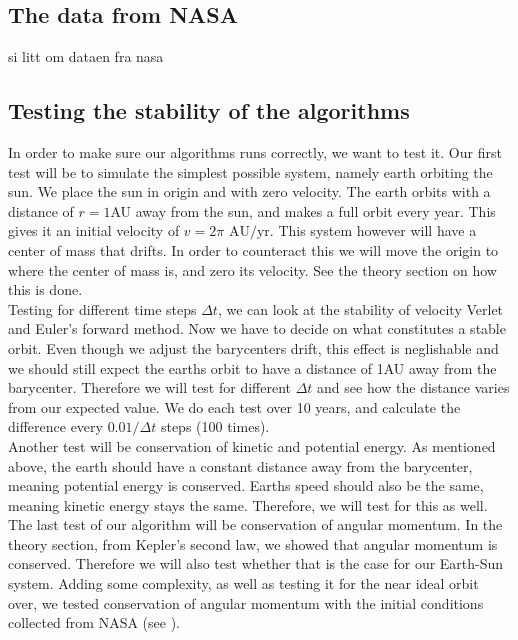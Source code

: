 \documentclass[reprint, english,notitlepage,nofootinbib]{revtex4-1}  %
\begin{document}
\subsection{The data from NASA}
si litt om dataen fra nasa

\subsection{Testing the stability of the algorithms}
In order to make sure our algorithms runs correctly, we want to test it. Our first test will be to simulate the simplest possible system, namely earth orbiting the sun. We place the sun in origin and with zero velocity. The earth orbits with a distance of $r=1$AU away from the sun, and makes a full orbit every year. This gives it an initial velocity of $v = 2\pi \text{ AU}/\text{yr}.$ This system however will have a center of mass that drifts. In order to counteract this we will move the origin to where the center of mass is, and zero its velocity. See the theory section on how this is done.
\\
Testing for different time steps $\Delta t$, we can look at the stability of velocity Verlet and Euler's forward method. Now we have to decide on what constitutes a stable orbit. Even though we adjust the barycenters drift, this effect is neglishable and we should still expect the earths orbit to have a distance of 1AU away from the barycenter. Therefore we will test for different $\Delta t$ and see how the distance varies from our expected value. We do each test over 10 years, and calculate the difference every $0.01/\Delta t$ steps (100 times).
\\
Another test will be conservation of kinetic and potential energy. As mentioned above, the earth should have a constant distance away from the barycenter, meaning potential energy is conserved. Earths speed should also be the same, meaning kinetic energy stays the same. Therefore, we will test for this as well. 
\\
The last test of our algorithm will be conservation of angular momentum. In the theory section, from Kepler's second law, we showed that angular momentum is conserved. Therefore we will also test whether that is the case for our Earth-Sun system. Adding some complexity, as well as testing it for the near ideal orbit over, we tested conservation of angular momentum with the initial conditions collected from NASA (see \citep{NASA}).
\end{document}

